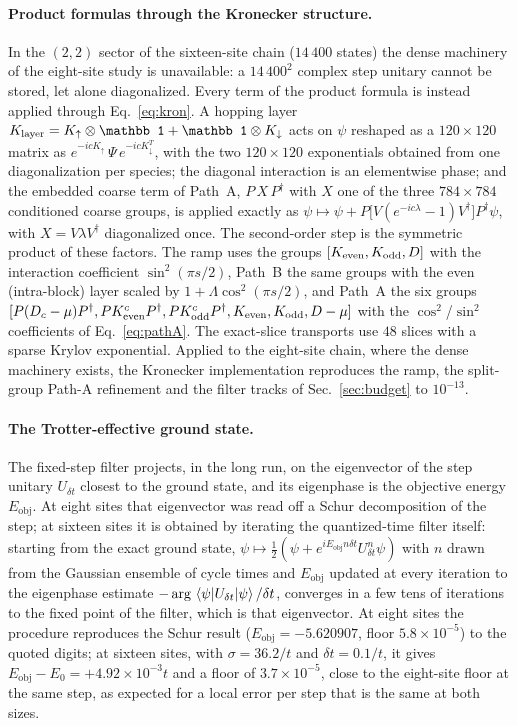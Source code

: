 \documentclass[a4paper,11pt,noarxiv]{quantumarticle}
\newcommand{\Eobj}{E_{\mathrm{obj}}}
\begin{document}
\paragraph{Product formulas through the Kronecker structure.}
In the $(2,2)$ sector of the sixteen-site chain ($14\,400$ states) the dense
machinery of the eight-site study is unavailable: a $14\,400^2$ complex step
unitary cannot be stored, let alone diagonalized.  Every term of the
product formula is instead applied through Eq.~\eqref{eq:kron}.  A hopping
layer $K_{\rm layer}=K_\uparrow\otimes\mathbb1+\mathbb1\otimes K_\downarrow$
acts on $\psi$ reshaped as a $120\times120$ matrix as
$e^{-icK_\uparrow}\,\Psi\,e^{-icK_\downarrow^T}$, with the two $120\times120$
exponentials obtained from one diagonalization per species; the diagonal
interaction is an elementwise phase; and the embedded coarse term of Path~A,
$P\,X\,P^\dagger$ with $X$ one of the three $784\times784$ conditioned coarse
groups, is applied exactly as
$\psi\mapsto\psi+P\big[V(e^{-ic\lambda}-1)V^\dagger\big]P^\dagger\psi$, with
$X=V\lambda V^\dagger$ diagonalized once.  The second-order step is the
symmetric product of these factors.  The ramp uses the groups
$[K_{\rm even},K_{\rm odd},D]$ with the interaction coefficient
$\sin^2(\pi s/2)$, Path~B the same groups with the even (intra-block) layer
scaled by $1+\Lambda\cos^2(\pi s/2)$, and Path~A the six groups
$[P(D_c-\mu)P^\dagger,PK^c_{\rm even}P^\dagger,PK^c_{\rm odd}P^\dagger,
K_{\rm even},K_{\rm odd},D-\mu]$ with the $\cos^2$/$\sin^2$ coefficients of
Eq.~\eqref{eq:pathA}.  The exact-slice transports use $48$ slices with a
sparse Krylov exponential.  Applied to the eight-site chain, where the
dense machinery exists, the Kronecker implementation reproduces the ramp,
the split-group Path-A refinement and the filter tracks of
Sec.~\ref{sec:budget} to $10^{-13}$.

\paragraph{The Trotter-effective ground state.}
The fixed-step filter projects, in the long run, on the eigenvector of the
step unitary $U_{\delta t}$ closest to the ground state, and its eigenphase
is the objective energy $\Eobj$.  At eight sites that eigenvector was read
off a Schur decomposition of the step; at sixteen sites it is obtained by
iterating the quantized-time filter itself: starting from the exact ground
state, $\psi\mapsto\tfrac12(\psi+e^{i\Eobj n\delta t}U_{\delta t}^n\psi)$
with $n$ drawn from the Gaussian ensemble of cycle times and $\Eobj$
updated at every iteration to the eigenphase estimate
$-\arg\expval{U_{\delta t}}{\psi}/\delta t$, converges in a few tens of iterations to the fixed point of the
filter, which is that eigenvector.  At eight sites the procedure reproduces
the Schur result ($\Eobj=-5.620907$, floor $5.8\times10^{-5}$) to the
quoted digits; at sixteen sites, with $\sigma=36.2/t$ and $\delta t=0.1/t$,
it gives $\Eobj-E_0=+4.92\times10^{-3}t$ and a floor of
$3.7\times10^{-5}$, close to the eight-site floor at the same step, as
expected for a local error per step that is the same at both sizes.
\end{document}
